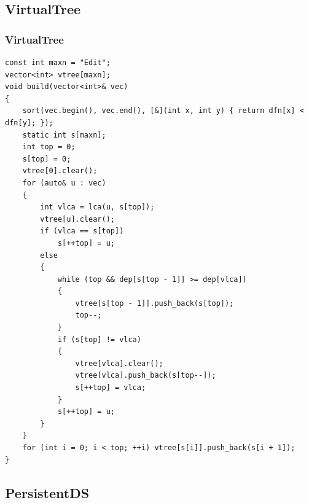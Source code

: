 \documentclass[twoside]{article}
\begin{document}
\subsection{VirtualTree}
\subsubsection{VirtualTree}
\begin{lstlisting}
const int maxn = "Edit";
vector<int> vtree[maxn];
void build(vector<int>& vec)
{
    sort(vec.begin(), vec.end(), [&](int x, int y) { return dfn[x] < dfn[y]; });
    static int s[maxn];
    int top = 0;
    s[top] = 0;
    vtree[0].clear();
    for (auto& u : vec)
    {
        int vlca = lca(u, s[top]);
        vtree[u].clear();
        if (vlca == s[top])
            s[++top] = u;
        else
        {
            while (top && dep[s[top - 1]] >= dep[vlca])
            {
                vtree[s[top - 1]].push_back(s[top]);
                top--;
            }
            if (s[top] != vlca)
            {
                vtree[vlca].clear();
                vtree[vlca].push_back(s[top--]);
                s[++top] = vlca;
            }
            s[++top] = u;
        }
    }
    for (int i = 0; i < top; ++i) vtree[s[i]].push_back(s[i + 1]);
}\end{lstlisting}
\subsection{PersistentDS}
\end{document}
